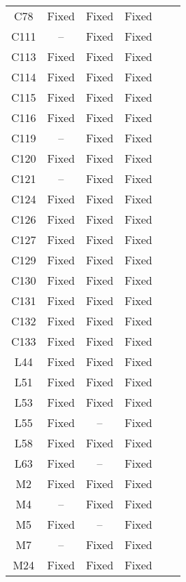 \begin{table}[!t]
{\begin{tabular}{|c|c|c|c|c|c|}
C78               & Fixed     & Fixed     &Fixed   \\
C111              & --        & Fixed     &Fixed   \\
C113              & Fixed     & Fixed     &Fixed   \\
C114              & Fixed     & Fixed     &Fixed   \\
C115              & Fixed     & Fixed     &Fixed   \\
C116              & Fixed     & Fixed     &Fixed   \\
C119              & --        & Fixed     &Fixed   \\
C120              & Fixed     & Fixed     &Fixed   \\
C121              & --        & Fixed     &Fixed   \\
C124              & Fixed     & Fixed     &Fixed   \\
C126              & Fixed     & Fixed     &Fixed   \\
C127              & Fixed     & Fixed     &Fixed   \\
C129              & Fixed     & Fixed     &Fixed   \\
C130              & Fixed     & Fixed     &Fixed   \\
C131              & Fixed     & Fixed     &Fixed   \\
C132              & Fixed     & Fixed     &Fixed   \\
C133              & Fixed     & Fixed     &Fixed   \\
\hline
L44               & Fixed     & Fixed     &Fixed   \\
L51               & Fixed     & Fixed     &Fixed   \\
L53               & Fixed     & Fixed     &Fixed   \\
L55               & Fixed     & --        &Fixed   \\
L58               & Fixed     & Fixed     &Fixed   \\
L63               & Fixed     & --        &Fixed   \\
\hline
M2                & Fixed     & Fixed     &Fixed   \\
M4                & --        & Fixed     &Fixed   \\
M5                & Fixed     & --        &Fixed   \\
M7                & --        & Fixed     &Fixed   \\
M24               & Fixed     & Fixed     &Fixed   \\

\end{tabular}}
\end{table}
